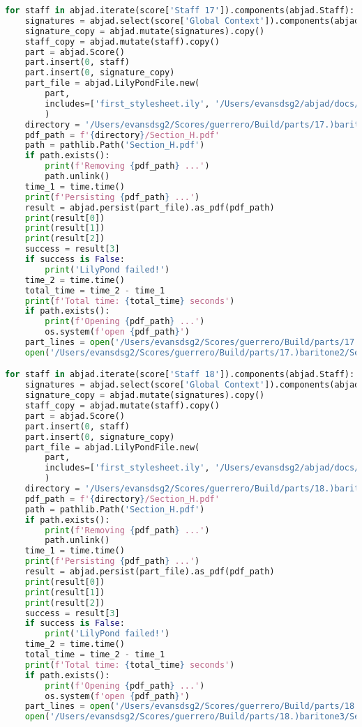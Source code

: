 \begin{lstlisting}[language=Python, caption=Invocation Source Code]
for staff in abjad.iterate(score['Staff 17']).components(abjad.Staff):
    signatures = abjad.select(score['Global Context']).components(abjad.Staff)
    signature_copy = abjad.mutate(signatures).copy()
    staff_copy = abjad.mutate(staff).copy()
    part = abjad.Score()
    part.insert(0, staff)
    part.insert(0, signature_copy)
    part_file = abjad.LilyPondFile.new(
        part,
        includes=['first_stylesheet.ily', '/Users/evansdsg2/abjad/docs/source/_stylesheets/abjad.ily'],
        )
    directory = '/Users/evansdsg2/Scores/guerrero/Build/parts/17.)baritone2'
    pdf_path = f'{directory}/Section_H.pdf'
    path = pathlib.Path('Section_H.pdf')
    if path.exists():
        print(f'Removing {pdf_path} ...')
        path.unlink()
    time_1 = time.time()
    print(f'Persisting {pdf_path} ...')
    result = abjad.persist(part_file).as_pdf(pdf_path)
    print(result[0])
    print(result[1])
    print(result[2])
    success = result[3]
    if success is False:
        print('LilyPond failed!')
    time_2 = time.time()
    total_time = time_2 - time_1
    print(f'Total time: {total_time} seconds')
    if path.exists():
        print(f'Opening {pdf_path} ...')
        os.system(f'open {pdf_path}')
    part_lines = open('/Users/evansdsg2/Scores/guerrero/Build/parts/17.)baritone2/Section_H.ly').readlines()
    open('/Users/evansdsg2/Scores/guerrero/Build/parts/17.)baritone2/Section_H.ly', 'w').writelines(part_lines[15:-1])

for staff in abjad.iterate(score['Staff 18']).components(abjad.Staff):
    signatures = abjad.select(score['Global Context']).components(abjad.Staff)
    signature_copy = abjad.mutate(signatures).copy()
    staff_copy = abjad.mutate(staff).copy()
    part = abjad.Score()
    part.insert(0, staff)
    part.insert(0, signature_copy)
    part_file = abjad.LilyPondFile.new(
        part,
        includes=['first_stylesheet.ily', '/Users/evansdsg2/abjad/docs/source/_stylesheets/abjad.ily'],
        )
    directory = '/Users/evansdsg2/Scores/guerrero/Build/parts/18.)baritone3'
    pdf_path = f'{directory}/Section_H.pdf'
    path = pathlib.Path('Section_H.pdf')
    if path.exists():
        print(f'Removing {pdf_path} ...')
        path.unlink()
    time_1 = time.time()
    print(f'Persisting {pdf_path} ...')
    result = abjad.persist(part_file).as_pdf(pdf_path)
    print(result[0])
    print(result[1])
    print(result[2])
    success = result[3]
    if success is False:
        print('LilyPond failed!')
    time_2 = time.time()
    total_time = time_2 - time_1
    print(f'Total time: {total_time} seconds')
    if path.exists():
        print(f'Opening {pdf_path} ...')
        os.system(f'open {pdf_path}')
    part_lines = open('/Users/evansdsg2/Scores/guerrero/Build/parts/18.)baritone3/Section_H.ly').readlines()
    open('/Users/evansdsg2/Scores/guerrero/Build/parts/18.)baritone3/Section_H.ly', 'w').writelines(part_lines[15:-1])


\end{lstlisting}
